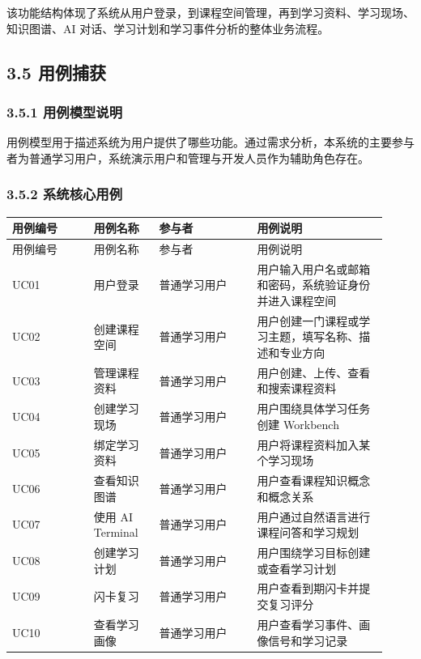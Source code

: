\documentclass[10pt,a4paper,fontset=none]{ctexart}
\begin{document}
该功能结构体现了系统从用户登录，到课程空间管理，再到学习资料、学习现场、知识图谱、AI 对话、学习计划和学习事件分析的整体业务流程。\par

\subsection*{3.5 用例捕获}

\subsubsection*{3.5.1 用例模型说明}

用例模型用于描述系统为用户提供了哪些功能。通过需求分析，本系统的主要参与者为普通学习用户，系统演示用户和管理与开发人员作为辅助角色存在。\par

\subsubsection*{3.5.2 系统核心用例}

\begingroup\scriptsize
\renewcommand{\arraystretch}{1.18}
\setlength{\LTleft}{0pt}
\setlength{\LTright}{0pt}
\begin{longtable}{>{\raggedright\arraybackslash}p{0.20\linewidth}>{\raggedright\arraybackslash}p{0.16\linewidth}>{\raggedright\arraybackslash}p{0.24\linewidth}>{\raggedright\arraybackslash}p{0.32\linewidth}}
\toprule
用例编号 & 用例名称 & 参与者 & 用例说明 \\
\midrule
\endfirsthead
\toprule
用例编号 & 用例名称 & 参与者 & 用例说明 \\
\midrule
\endhead
UC01 & 用户登录 & 普通学习用户 & 用户输入用户名或邮箱和密码，系统验证身份并进入课程空间 \\
UC02 & 创建课程空间 & 普通学习用户 & 用户创建一门课程或学习主题，填写名称、描述和专业方向 \\
UC03 & 管理课程资料 & 普通学习用户 & 用户创建、上传、查看和搜索课程资料 \\
UC04 & 创建学习现场 & 普通学习用户 & 用户围绕具体学习任务创建 Workbench \\
UC05 & 绑定学习资料 & 普通学习用户 & 用户将课程资料加入某个学习现场 \\
UC06 & 查看知识图谱 & 普通学习用户 & 用户查看课程知识概念和概念关系 \\
UC07 & 使用 AI Terminal & 普通学习用户 & 用户通过自然语言进行课程问答和学习规划 \\
UC08 & 创建学习计划 & 普通学习用户 & 用户围绕学习目标创建或查看学习计划 \\
UC09 & 闪卡复习 & 普通学习用户 & 用户查看到期闪卡并提交复习评分 \\
UC10 & 查看学习画像 & 普通学习用户 & 用户查看学习事件、画像信号和学习记录 \\
\bottomrule
\end{longtable}
\endgroup
\end{document}
